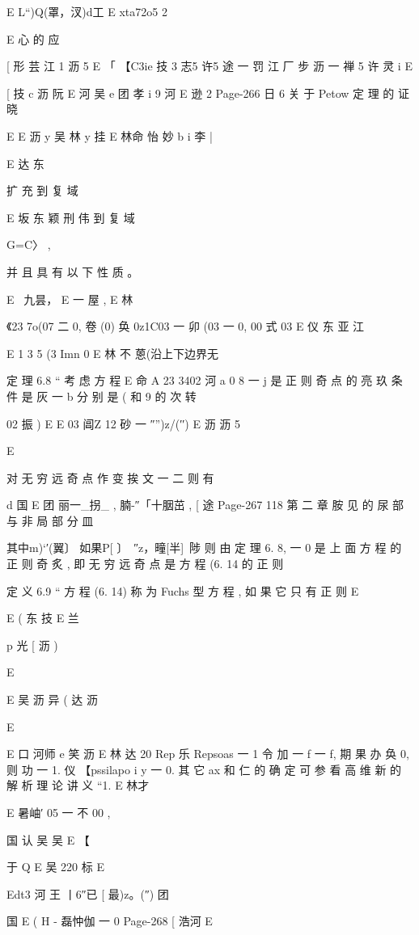 {{{{{{{{{{{{{{{E L“)Q(罩，汊)d工 E xta72o5 2

E 心 的 应

[ 形 芸 江
1 沥 5
E
「 【C3ie 技 3 志5 许5 途 一 罚 江 厂 步 沥 一 禅 5 许 灵 i
E

[ 技 c 沥 阮
E 河 吴 e
团 孝 i 9 河 E 逊 2
Page-266
日 6 关 于 Petow 定 理 的 证 晓

E
E 沥 y 吴 林 y 挂
E 林命 怡 妙 b i 李 |

E 达 东

扩 充 到 复 域

E 坂 东 颖 刑 伟
到 复 域

G=C〉 ,

并 且 具 有 以 下 性 质 。

E ~九昙， E 一 屋 , E 林

《23 7o(07 二 0, 卷 (0) 奂 0z1C03 一 卯 (03 一 0, 00 式 03
E 仪 东 亚 江

E 1 3 5
(3 Imn 0 E 林 不 蒽(沿上下边界无

定 理 6.8 “ 考 虑 方 程
E 命 A 23 3402 河 a 0
8 一 j 是 正 则 奇 点 的 亮 玖 条 件 是 灰 一 b 分 别 是 ( 和 9 的 次
转

02 振 ) E E
03 阊Z 12 砂 一 ″”)z/(′′) E 沥 沥 5

E

对 无 穷 远 奇 点 作 变 挨 文 一 二 则 有

d 国 E 团
丽一_拐_ , 腩-″「十胭茁 ,
[ 途
Page-267
118 第 二 章 胺 见 的 尿 部 与 非 局 部 分 皿

其中m)`′(翼〕 如果P[ 〕~″z，疃[半]~陟 则 由 定 理 6. 8,
一 0 是 上 面 方 程 的 正 则 奇 炙 , 即 无 穷 远 奇 点 是 方 程 (6. 14 的 正 则

定 义 6.9 “ 方 程 (6. 14) 称 为 Fuchs 型 方 程 , 如 果 它 只 有 正 则
E

E ( 东
技
E 兰

p 光 [ 沥 )

E

E 吴 沥 异 ( 达 沥

E

E 口 河师 e 笑 沥
E 林 达 20
Rep 乐 Repsoas 一 1 令 加 一 f 一 f, 期 果 办 奂 0, 则 功 一 1. 仪
【pssilapo i y
一 0. 其 它 ax 和 仁 的 确 定 可 参 看 高 维 新 的 解 析 理 论 讲 义 “1.
E 林才

E 暑岫′ 05 一 不 00 ,

国 认 吴 吴
E
【

于 Q E 吴 220 标
E

Edt3 河 王 丨6″已 [ 最)z。(″) 团

国
E ( H - 磊忡伽 一 0
Page-268
[ 浩河 E

}}}}}}}}}}}}}}}
